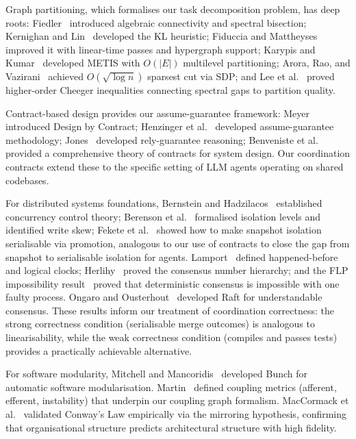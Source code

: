 Graph partitioning, which formalises our task decomposition problem, has deep
roots: Fiedler~\citep{Fiedler1973} introduced algebraic connectivity and
spectral bisection; Kernighan and Lin~\citep{KernighanLin1970} developed the KL
heuristic; Fiduccia and Mattheyses~\citep{FiducciaMattheyses1982} improved it
with linear-time passes and hypergraph support; Karypis and
Kumar~\citep{KarypisKumar1998} developed METIS with $O(|E|)$ multilevel
partitioning; Arora, Rao, and Vazirani~\citep{AroraRaoVazirani2009} achieved
$O(\sqrt{\log n})$ sparsest cut via SDP; and Lee et al.~\citep{Lee2012cheeger}
proved higher-order Cheeger inequalities connecting spectral gaps to partition
quality.

Contract-based design provides our assume-guarantee framework:
Meyer~\citep{Meyer1992} introduced Design by Contract; Henzinger
et al.~\citep{Henzinger2002} developed assume-guarantee methodology;
Jones~\citep{Jones1983} developed rely-guarantee reasoning; Benveniste
et al.~\citep{Benveniste2018} provided a comprehensive theory of contracts for
system design.  Our coordination contracts extend these to the specific setting
of LLM agents operating on shared codebases.

For distributed systems foundations, Bernstein and Hadzilacos~\citep{BernsteinHadzilacos1987} established concurrency control theory; Berenson et al.~\citep{Berenson1995} formalised isolation levels and identified write skew; Fekete et al.~\citep{Fekete2005} showed how to make snapshot isolation serialisable via promotion, analogous to our use of contracts to close the gap from snapshot to serialisable isolation for agents. Lamport~\citep{Lamport1978} defined happened-before and logical clocks; Herlihy~\citep{Herlihy1991} proved the consensus number hierarchy; and the FLP impossibility result~\citep{FLP1985} proved that deterministic consensus is impossible with one faulty process. Ongaro and Ousterhout~\citep{Ongaro2014} developed Raft for understandable consensus. These results inform our treatment of coordination correctness: the strong correctness condition (serialisable merge outcomes) is analogous to linearisability, while the weak correctness condition (compiles and passes tests) provides a practically achievable alternative.

For software modularity, Mitchell and Mancoridis~\citep{Mitchell2006bunch} developed Bunch for automatic software modularisation. Martin~\citep{Martin1994} defined coupling metrics (afferent, efferent, instability) that underpin our coupling graph formalism. MacCormack et al.~\citep{MacCormack2012} validated Conway's Law empirically via the mirroring hypothesis, confirming that organisational structure predicts architectural structure with high fidelity.


